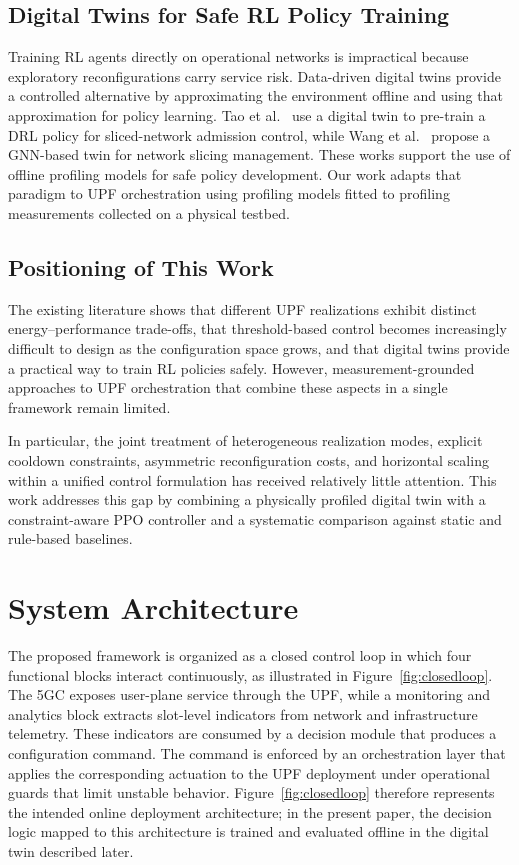 \documentclass[a4paper,fleqn]{cas-sc}
\begin{document}
\subsection{Digital Twins for Safe RL Policy Training}
\label{subsec:rel_dt}

Training RL agents directly on operational networks is impractical because exploratory reconfigurations carry service risk. Data-driven digital twins provide a controlled alternative by approximating the environment offline and using that approximation for policy learning. Tao et al.~\cite{tao2025tcomm} use a digital twin to pre-train a DRL policy for sliced-network admission control, while Wang et al.~\cite{wang2022tii} propose a GNN-based twin for network slicing management. These works support the use of offline profiling models for safe policy development. Our work adapts that paradigm to UPF orchestration using profiling models fitted to profiling measurements collected on a physical testbed.

\subsection{Positioning of This Work}
\label{subsec:rel_position}

The existing literature shows that different UPF realizations exhibit distinct energy--performance trade-offs, that threshold-based control becomes increasingly difficult to design as the configuration space grows, and that digital twins provide a practical way to train RL policies safely. However, measurement-grounded approaches to UPF orchestration that combine these aspects in a single framework remain limited.

In particular, the joint treatment of heterogeneous realization modes, explicit cooldown constraints, asymmetric reconfiguration costs, and horizontal scaling within a unified control formulation has received relatively little attention. This work addresses this gap by combining a physically profiled digital twin with a constraint-aware PPO controller and a systematic comparison against static and rule-based baselines.

\section{System Architecture}
\label{sys}

The proposed framework is organized as a closed control loop in which four functional blocks interact continuously, as illustrated in Figure~\ref{fig:closedloop}. The 5GC exposes user-plane service through the UPF, while a monitoring and analytics block extracts slot-level indicators from network and infrastructure telemetry. These indicators are consumed by a decision module that produces a configuration command. The command is enforced by an orchestration layer that applies the corresponding actuation to the UPF deployment under operational guards that limit unstable behavior. Figure~\ref{fig:closedloop} therefore represents the intended online deployment architecture; in the present paper, the decision logic mapped to this architecture is trained and evaluated offline in the digital twin described later.
\end{document}
